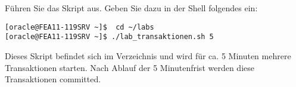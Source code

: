         \item Führen Sie das Skript  aus. Geben Sie dazu in der Shell folgendes ein:
\begin{lstlisting}[language=terminal]
[oracle@FEA11-119SRV ~]$  cd ~/labs
[oracle@FEA11-119SRV ~]$ ./lab_transaktionen.sh 5
\end{lstlisting}
        Dieses Skript befindet sich im Verzeichnis  und wird für ca. 5  Minuten mehrere Transaktionen starten. Nach Ablauf der 5 Minutenfrist werden diese Transaktionen committed.
